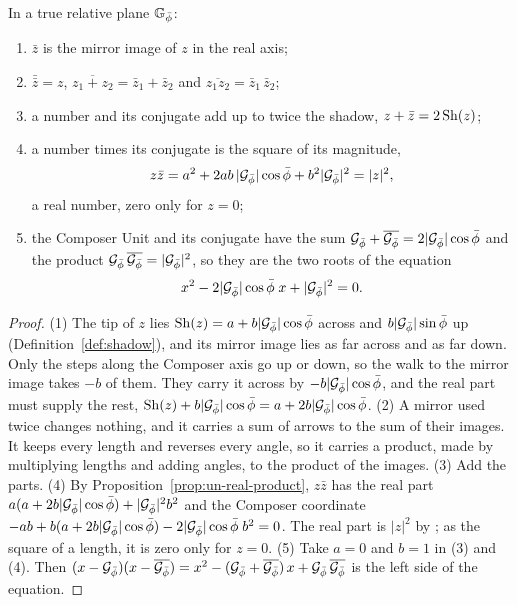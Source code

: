 \begin{theorem}\label{thm:gn-conjugate}
In a true relative plane $\mathbb{G}_{\bar{\phi}}$:
\begin{enumerate}
  \item $\bar{z}$ is the mirror image of $z$ in the real axis;
  \item $\bar{\bar{z}} = z$, $\overline{z_1 + z_2} = \bar{z}_1 + \bar{z}_2$ and $\overline{z_1 z_2} = \bar{z}_1\,\bar{z}_2$;
  \item a number and its conjugate add up to twice the shadow, $z + \bar{z} = 2\operatorname{Sh}(z)$;
  \item a number times its conjugate is the square of its magnitude,
  \[
  z\bar{z} = a^2 + 2ab\,|\mathcal{G}_{\bar{\phi}}|\cos\bar{\phi} + b^2|\mathcal{G}_{\bar{\phi}}|^2 = |z|^2 ,
  \]
  a real number, zero only for $z = 0$;
  \item the Composer Unit and its conjugate have the sum $\mathcal{G}_{\bar{\phi}} + \overline{\mathcal{G}_{\bar{\phi}}} = 2|\mathcal{G}_{\bar{\phi}}|\cos\bar{\phi}$ and the product $\mathcal{G}_{\bar{\phi}}\,\overline{\mathcal{G}_{\bar{\phi}}} = |\mathcal{G}_{\bar{\phi}}|^2$, so they are the two roots of the equation
  \[
  x^2 - 2|\mathcal{G}_{\bar{\phi}}|\cos\bar{\phi}\;x + |\mathcal{G}_{\bar{\phi}}|^2 = 0 .
  \]
\end{enumerate}
\end{theorem}

\begin{proof}
(1) The tip of $z$ lies $\operatorname{Sh}(z) = a + b|\mathcal{G}_{\bar{\phi}}|\cos\bar{\phi}$ across and $b|\mathcal{G}_{\bar{\phi}}|\sin\bar{\phi}$ up (Definition~\ref{def:shadow}), and its mirror image lies as far across and as far down. Only the steps along the Composer axis go up or down, so the walk to the mirror image takes $-b$ of them. They carry it across by $-b|\mathcal{G}_{\bar{\phi}}|\cos\bar{\phi}$, and the real part must supply the rest, $\operatorname{Sh}(z) + b|\mathcal{G}_{\bar{\phi}}|\cos\bar{\phi} = a + 2b|\mathcal{G}_{\bar{\phi}}|\cos\bar{\phi}$. (2) A mirror used twice changes nothing, and it carries a sum of arrows to the sum of their images. It keeps every length and reverses every angle, so it carries a product, made by multiplying lengths and adding angles, to the product of the images. (3) Add the parts. (4) By Proposition~\ref{prop:un-real-product}, $z\bar{z}$ has the real part $a(a + 2b|\mathcal{G}_{\bar{\phi}}|\cos\bar{\phi}) + |\mathcal{G}_{\bar{\phi}}|^2 b^2$ and the Composer coordinate $-ab + b(a + 2b|\mathcal{G}_{\bar{\phi}}|\cos\bar{\phi}) - 2|\mathcal{G}_{\bar{\phi}}|\cos\bar{\phi}\; b^2 = 0$. The real part is $|z|^2$ by ; as the square of a length, it is zero only for $z = 0$. (5) Take $a = 0$ and $b = 1$ in (3) and (4). Then $(x - \mathcal{G}_{\bar{\phi}})(x - \overline{\mathcal{G}_{\bar{\phi}}}) = x^2 - (\mathcal{G}_{\bar{\phi}} + \overline{\mathcal{G}_{\bar{\phi}}})\,x + \mathcal{G}_{\bar{\phi}}\,\overline{\mathcal{G}_{\bar{\phi}}}$ is the left side of the equation.
\end{proof}

